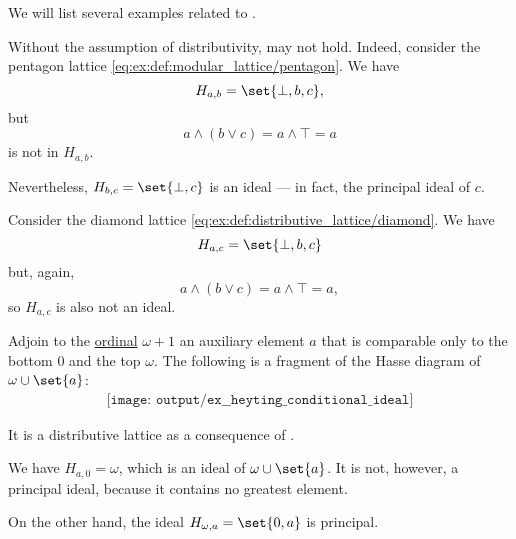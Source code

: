 \begin{example}\label{ex:heyting_conditional_ideal}
  We will list several examples related to .

  \begin{thmenum}
     Without the assumption of distributivity,  may not hold. Indeed, consider the pentagon lattice \eqref{eq:ex:def:modular_lattice/pentagon}. We have
    \begin{equation*}
      H_{a,b} = \set{ \bot, b, c },
    \end{equation*}
    but
    \begin{equation*}
      a \wedge (b \vee c) = a \wedge \top = a
    \end{equation*}
    is not in \( H_{a,b} \).

    Nevertheless, \( H_{b,c} = \set{ \bot, c } \) is an ideal --- in fact, the principal ideal of \( c \).

     Consider the diamond lattice \eqref{eq:ex:def:distributive_lattice/diamond}. We have
    \begin{equation*}
      H_{a,c} = \set{ \bot, b, c }
    \end{equation*}
    but, again,
    \begin{equation*}
      a \wedge (b \vee c) = a \wedge \top = a,
    \end{equation*}
    so \( H_{a,c} \) is also not an ideal.

     Adjoin to the \hyperref[def:ordinal]{ordinal} \( \omega + 1 \) an auxiliary element \( a \) that is comparable only to the bottom \( 0 \) and the top \( \omega \). The following is a fragment of the Hasse diagram of \( \omega \cup \set{ a } \):
    \begin{equation*}
      \begin{aligned}
        \texttt{[image: output/ex\_\_heyting\_conditional\_ideal]}
      \end{aligned}
    \end{equation*}

    It is a distributive lattice as a consequence of .

    We have \( H_{a,0} = \omega \), which is an ideal of \( \omega \cup \set{ a } \). It is not, however, a principal ideal, because it contains no greatest element.

    On the other hand, the ideal \( H_{\omega,a} = \set{ 0, a } \) is principal.
  \end{thmenum}
\end{example}

